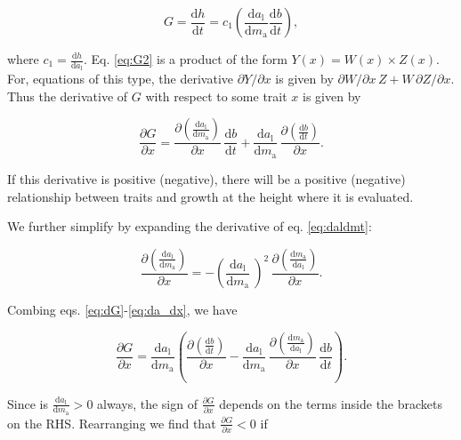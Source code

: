 \documentclass[12pt, a4paper]{article}
\begin{document}
\begin{appendices}
\begin{equation} \label{eq:G2}
G = \frac{\textrm{d}h}{\textrm{d}t} = c_1   \left(\frac{\textrm{d}a_\textrm{l}} {\textrm{d}m_\textrm{a}}  \frac{ \textrm{d}b} {\textrm{d}t} \right),
\end{equation}

where $c_1 = \frac{\textrm{d}h}{\textrm{d}a_\textrm{l}}$. Eq.
\ref{eq:G2} is a product of the form $Y(x) = W(x) \times Z(x)$. For,
equations of this type, the derivative $\partial{Y}/\partial{x}$ is
given by $\partial{W}/\partial{x} \, Z + W \, \partial{Z}/\partial{x}$. Thus
the derivative of $G$ with respect to some trait $x$  is given by

\begin{equation} \label{eq:dG}
\frac{\partial G} {\partial x} =
\frac{\partial \left(\frac{\textrm{d}a_\textrm{l}} {\textrm{d}m_\textrm{a}}\right)}{\partial x}
 \, \frac{ \textrm{d}b} {\textrm{d}t}
+ \frac{\textrm{d}a_\textrm{l}} {\textrm{d}m_\textrm{a}}
\, \frac{\partial \left( \frac{ \textrm{d}b} {\textrm{d}t}\right)}{\partial x}.
\end{equation}

If this derivative is positive (negative), there will be a positive (negative) relationship
between traits and growth at the height where it is evaluated.

We further simplify by expanding the derivative of eq. \ref{eq:daldmt}:

\begin{equation} \label{eq:da_dx}
\frac{\partial \left(\frac{\textrm{d}a_\textrm{l}} {\textrm{d}m_\textrm{a}}\right)}
{\partial x} = -\left(\frac{\textrm{d}a_\textrm{l}} {\textrm{d}m_\textrm{a}}\ \right)^2
\, \frac{\partial \left(\frac{\textrm{d}m_\textrm{a}} {\textrm{d}a_\textrm{l}}\right)
}{\partial x}.
\end{equation}

Combing eqs. \ref{eq:dG}-\ref{eq:da_dx}, we have

\begin{equation} \label{eq:dG2}
\frac{\partial G} {\partial x} =
\frac{\textrm{d}a_\textrm{l}} {\textrm{d}m_\textrm{a}}
\left(
\frac{\partial \left( \frac{ \textrm{d}b} {\textrm{d}t}\right)}{\partial x}
- \frac{\textrm{d}a_\textrm{l}} {\textrm{d}m_\textrm{a}}
\,  \frac{\partial \left(\frac{\textrm{d}m_\textrm{a}} {\textrm{d}a_\textrm{l}}\right)
}{\partial x}
 \, \frac{ \textrm{d}b} {\textrm{d}t}
\right).
\end{equation}

Since is $\frac{\textrm{d}a_\textrm{l}} {\textrm{d}m_\textrm{a}}>0$ always, the sign
of $\frac{\partial G} {\partial x}$ depends on the terms inside the brackets on the
RHS. Rearranging we find that $\frac
{\partial G} {\partial x} < 0$ if


\end{appendices}
\end{document}
